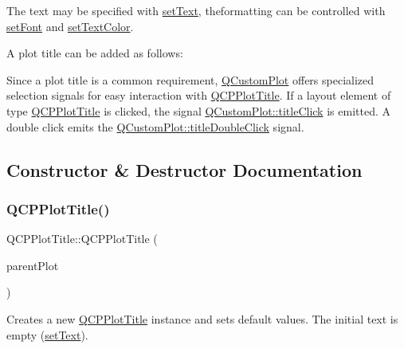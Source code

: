 The text may be specified with \mbox{\hyperlink{class_q_c_p_plot_title_aae5a93e88050dfb2cbf6adc087516821}{set\+Text}}, theformatting can be controlled with \mbox{\hyperlink{class_q_c_p_plot_title_a199fc7170802ea65006c371875349e37}{set\+Font}} and \mbox{\hyperlink{class_q_c_p_plot_title_a71273e3a0ca6b4c151591b37b9e5ce33}{set\+Text\+Color}}.

A plot title can be added as follows\+: 
\begin{DoxyCodeInclude}
\end{DoxyCodeInclude}
 Since a plot title is a common requirement, \mbox{\hyperlink{class_q_custom_plot}{Q\+Custom\+Plot}} offers specialized selection signals for easy interaction with \mbox{\hyperlink{class_q_c_p_plot_title}{Q\+C\+P\+Plot\+Title}}. If a layout element of type \mbox{\hyperlink{class_q_c_p_plot_title}{Q\+C\+P\+Plot\+Title}} is clicked, the signal \mbox{\hyperlink{class_q_custom_plot_a2137a819e518fee7edd1c0bf5984d8d6}{Q\+Custom\+Plot\+::title\+Click}} is emitted. A double click emits the \mbox{\hyperlink{class_q_custom_plot_ad51d65f6abf5edfaeef6e0519a4c1a2f}{Q\+Custom\+Plot\+::title\+Double\+Click}} signal. 

\subsection{Constructor \& Destructor Documentation}
\mbox{\label{class_q_c_p_plot_title_aaae17bee2de6d6a1e695f76fb1abed03}} 
\subsubsection{\texorpdfstring{Q\+C\+P\+Plot\+Title()}{QCPPlotTitle()}\hspace{0.1cm}{\footnotesize\ttfamily [1/2]}}
{\footnotesize\ttfamily Q\+C\+P\+Plot\+Title\+::\+Q\+C\+P\+Plot\+Title (\begin{DoxyParamCaption}\item[{\mbox{\hyperlink{class_q_custom_plot}{Q\+Custom\+Plot}} $\ast$}]{parent\+Plot }\end{DoxyParamCaption})\hspace{0.3cm}{\ttfamily [explicit]}}

Creates a new \mbox{\hyperlink{class_q_c_p_plot_title}{Q\+C\+P\+Plot\+Title}} instance and sets default values. The initial text is empty (\mbox{\hyperlink{class_q_c_p_plot_title_aae5a93e88050dfb2cbf6adc087516821}{set\+Text}}).

